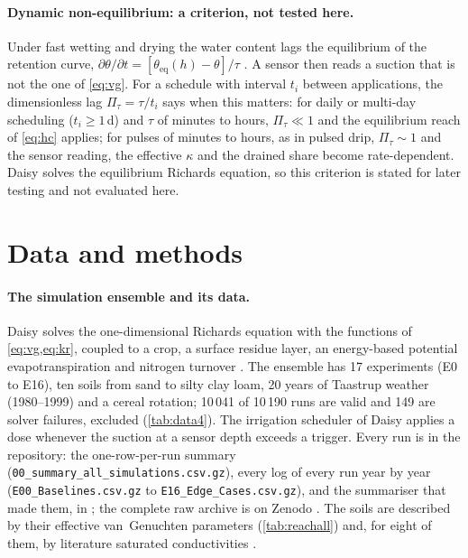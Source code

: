 \paragraph{Dynamic non-equilibrium: a criterion, not tested here.}
Under fast wetting and drying the water content lags the equilibrium of the retention curve, $\partial\theta/\partial t=[\theta_{\mathrm{eq}}(h)-\theta]/\tau$ \citep{RossSmettem2000,Hassanizadeh2002,Diamantopoulos2012VZJ,Diamantopoulos2012WRR}. A sensor then reads a suction that is not the one of \cref{eq:vg}. For a schedule with interval $t_i$ between applications, the dimensionless lag $\Pi_\tau=\tau/t_i$ says when this matters: for daily or multi-day scheduling ($t_i\geq1$\,d) and $\tau$ of minutes to hours, $\Pi_\tau\ll1$ and the equilibrium reach of \cref{eq:hc} applies; for pulses of minutes to hours, as in pulsed drip, $\Pi_\tau\sim1$ and the sensor reading, the effective $\kappa$ and the drained share become rate-dependent. Daisy solves the equilibrium Richards equation, so this criterion is stated for later testing and not evaluated here.

\section{Data and methods}
\paragraph{The simulation ensemble and its data.}
Daisy solves the one-dimensional Richards equation with the functions of \cref{eq:vg,eq:kr}, coupled to a crop, a surface residue layer, an energy-based potential evapotranspiration and nitrogen turnover \citep{Hansen1991,Hansen2012,Holbak2026}. The ensemble has 17 experiments (E0 to E16), ten soils from sand to silty clay loam, 20 years of Taastrup weather (1980--1999) and a cereal rotation; 10\,041 of 10\,190 runs are valid and 149 are solver failures, excluded (\cref{tab:data4}). The irrigation scheduler of Daisy applies a dose whenever the suction at a sensor depth exceeds a trigger. Every run is in the repository: the one-row-per-run summary (\texttt{00\_summary\_all\_simulations.csv.gz}), every log of every run year by year (\texttt{E00\_Baselines.csv.gz} to \texttt{E16\_Edge\_Cases.csv.gz}), and the summariser that made them, in \cslink; the complete raw archive is on Zenodo \citep{HaliluData}. The soils are described by their effective van~Genuchten parameters (\cref{tab:reachall}) and, for eight of them, by literature saturated conductivities \citep{Carsel1988}.


